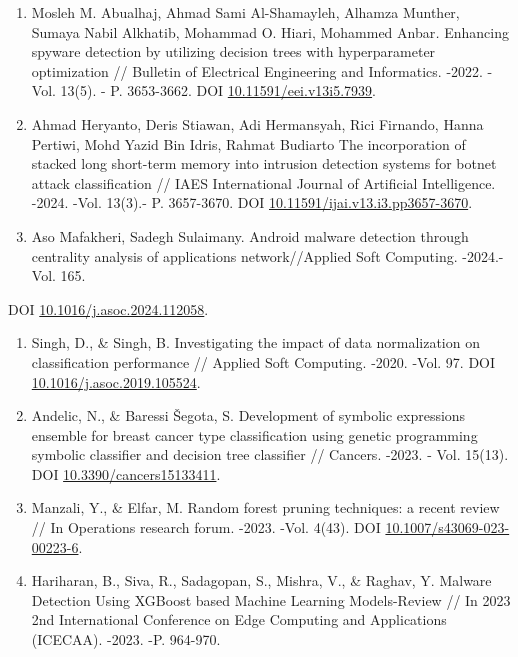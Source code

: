 \begin{references}
\begin{enumerate}
\def\labelenumi{\arabic{enumi}.}
\setcounter{enumi}{8}
\item
  Mosleh M. Abualhaj, Ahmad Sami Al-Shamayleh, Alhamza Munther, Sumaya
  Nabil Alkhatib, Mohammad O. Hiari, Mohammed Anbar\emph{.} Enhancing
  spyware detection by utilizing decision trees with hyperparameter
  optimization // Bulletin of Electrical Engineering and Informatics.
  -2022. -Vol. 13(5). - P. 3653-3662. DOI
  \href{https://doi.org/10.11591/eei.v13i5.7939}{10.11591/eei.v13i5.7939}.
\item
  Ahmad Heryanto, Deris Stiawan, Adi Hermansyah, Rici Firnando, Hanna
  Pertiwi, Mohd Yazid Bin Idris, Rahmat Budiarto The incorporation of
  stacked long short-term memory into intrusion detection systems for
  botnet attack classification // IAES International Journal of
  Artificial Intelligence. -2024. -Vol. 13(3).- P. 3657-3670. DOI
  \href{https://doi.org/10.11591/ijai.v13.i3.pp3657-3670}{10.11591/ijai.v13.i3.pp3657-3670}.
\item
  Aso Mafakheri, Sadegh Sulaimany. Android malware detection through
  centrality analysis of applications network//Applied Soft Computing.
  -2024.-Vol. 165.
\end{enumerate}

DOI
\href{https://doi.org/10.1016/j.asoc.2024.112058}{10.1016/j.asoc.2024.112058}.

\begin{enumerate}
\def\labelenumi{\arabic{enumi}.}
\setcounter{enumi}{11}
\item
  Singh, D., \& Singh, B. Investigating the impact of data normalization
  on classification performance // Applied Soft Computing. -2020. -Vol.
  97. DOI
  \href{https://doi.org/10.1016/j.asoc.2019.105524}{10.1016/j.asoc.2019.105524}.
\item
  Andelic, N., \& Baressi Šegota, S. Development of symbolic expressions
  ensemble for breast cancer type classification using genetic
  programming symbolic classifier and decision tree classifier //
  Cancers. -2023. - Vol. 15(13). DOI
  \href{https://doi.org/10.3390/cancers15133411}{10.3390/cancers15133411}.
\item
  Manzali, Y., \& Elfar, M. Random forest pruning techniques: a recent
  review // In Operations research forum. -2023. -Vol. 4(43). DOI
  \href{https://doi.org/10.1007/s43069-023-00223-6}{10.1007/s43069-023-00223-6}.
\item
  Hariharan, B., Siva, R., Sadagopan, S., Mishra, V., \& Raghav, Y.
  Malware Detection Using XGBoost based Machine Learning Models-Review
  // In 2023 2nd International Conference on Edge Computing and
  Applications (ICECAA). -2023. -P. 964-970.
\end{enumerate}


\end{references}
